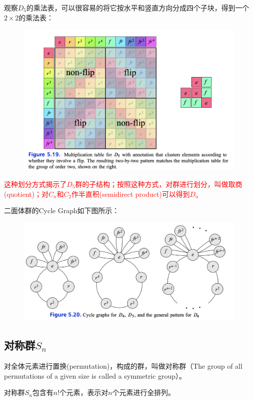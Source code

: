 \documentclass[12pt]{article}
\begin{document}
观察$D_5$的乘法表，可以很容易的将它按水平和竖直方向分成四个子块，得到一个$2\times 2$的乘法表：
\begin{figure}[H]
    \centering
    \includegraphics[width=1\textwidth]{fig/Group/MultiplicationTable-D5.png}
\end{figure}
\textcolor{red}{这种划分方式揭示了$D_5$群的子结构；按照这种方式，对群进行划分，叫做取商(quotient)；对$C_n$和$C_2$作半直积(semidirect product)可以得到$D_n$}

二面体群的Cycle Graph如下图所示：
\begin{figure}[H]
    \centering
    \includegraphics[width=1\textwidth]{fig/Group/CycleGraph-Dihedral.png}
\end{figure}

\subsection{对称群$S_n$}
对全体元素进行置换(permutation)，构成的群，叫做对称群（The group of all permutations of a given size is called a symmetric group）。

对称群$S_n$包含有$n!$个元素，表示对$n$个元素进行全排列。
\end{document}
